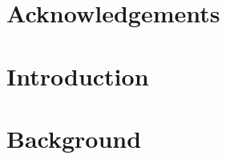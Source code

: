 \documentclass[12pt, TexShade, letterpaper]{report}
\begin{document}
\chapter*{Acknowledgements}
	\label{chap:acknowledgments}


 \tableofcontents\thispagestyle{plain}

 \listoffigures\thispagestyle{plain}
 \listoftables

  \clearpage

    \chapter{Introduction}
    

    \chapter{Background}
    





    
    \printbibliography
\end{document}
